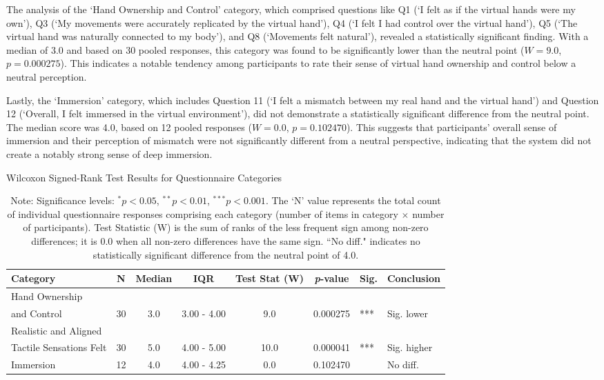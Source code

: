 The analysis of the `Hand Ownership and Control' category, which comprised questions like Q1 (`I felt as if the virtual hands were my own'), Q3 (`My movements were accurately replicated by the virtual hand'), Q4 (`I felt I had control over the virtual hand'), Q5 (`The virtual hand was naturally connected to my body'), and Q8 (`Movements felt natural'), revealed a statistically significant finding. With a median of 3.0 and based on 30 pooled responses, this category was found to be significantly lower than the neutral point ($W=9.0$, $p=0.000275$). This indicates a notable tendency among participants to rate their sense of virtual hand ownership and control below a neutral perception.

Lastly, the `Immersion' category, which includes Question 11 (`I felt a mismatch between my real hand and the virtual hand') and Question 12 (`Overall, I felt immersed in the virtual environment'), did not demonstrate a statistically significant difference from the neutral point. The median score was 4.0, based on 12 pooled responses ($W=0.0$,  $p=0.102470$). This suggests that participants' overall sense of immersion and their perception of mismatch were not significantly different from a neutral perspective, indicating that the system did not create a notably strong sense of deep immersion.

\begin{table}[H]
    \centering
    \caption{Wilcoxon Signed-Rank Test Results for Questionnaire Categories}
    \label{tab:wilcoxon_category_results}
    \begin{tabular}{@{} p{2.5cm} c c c c S[table-format=1.6] l p{1.5cm} @{}}
        \toprule
        \textbf{Category} & \textbf{N} & \textbf{Median} & \textbf{IQR} & \textbf{Test Stat (W)} & \textbf{\textit{p}-value} & \textbf{Sig.} & \textbf{Conclusion} \\
        \midrule
        Hand Ownership \\ and Control & 30 & 3.0 & 3.00 - 4.00 & 9.0 & 0.000275 & *** & Sig. lower  \\
        \midrule
        Realistic and Aligned \\ Tactile Sensations Felt & 30 & 5.0 & 4.00 - 5.00 & 10.0 & 0.000041 & *** & Sig. higher  \\
        \midrule
        Immersion & 12 & 4.0 & 4.00 - 4.25 & 0.0 & 0.102470 & & No diff. \\
        \bottomrule
    \end{tabular}
    \caption*{Note: Significance levels: $^* p < 0.05$, $^{**} p < 0.01$, $^{***} p < 0.001$. The `N' value represents the total count of individual questionnaire responses comprising each category (number of items in category $\times$ number of participants). Test Statistic (W) is the sum of ranks of the less frequent sign among non-zero differences; it is 0.0 when all non-zero differences have the same sign. ``No diff." indicates no statistically significant difference from the neutral point of 4.0.}
\end{table}

